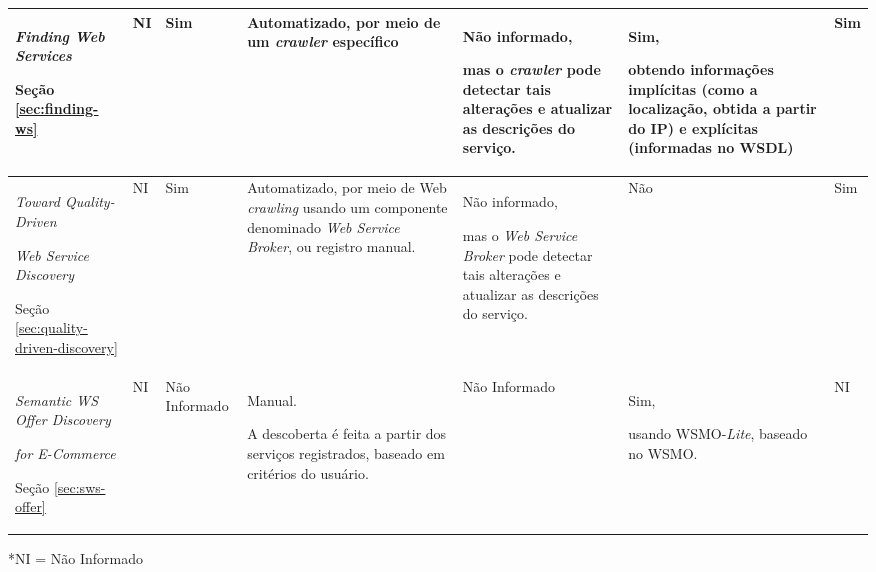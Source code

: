 \begin{center}
{\begin{tabular}{|p{2.5cm}|p{0.6cm}|p{2.5cm}|p{2.9cm}|p{3.5cm}|p{1.5cm}|p{0.4cm}|}
    \hline
	\textit{Finding Web Services} \cite{lausen2007finding}\par Seção \ref{sec:finding-ws} 
	& NI
	& Sim & Automatizado, por meio de um \textit{crawler} específico 
	& Não informado,\par mas o \textit{crawler} pode detectar tais alterações e atualizar as descrições do serviço.
	& Sim,\par obtendo informações implícitas (como a localização, obtida a partir do IP) e explícitas (informadas no WSDL) 
	& Sim \\

    \hline
	\textit{Toward Quality-Driven}\par \textit{Web Service Discovery} \cite{al2008toward}\par Seção \ref{sec:quality-driven-discovery} 
	& NI & Sim
	& Automatizado, por meio de Web \textit{crawling} usando um componente denominado \textit{Web Service Broker}, ou registro manual.
	& Não informado,\par mas o \textit{Web Service Broker} pode detectar tais alterações e atualizar as descrições do serviço.
	& Não & Sim \\

    \hline
   	 \textit{Semantic WS Offer Discovery}\par \textit{for E-Commerce} \cite{kopecky2008semantic}\par Seção \ref{sec:sws-offer} 
	 & NI & Não Informado & Manual.\par A descoberta é feita a partir dos serviços registrados, baseado em critérios do usuário.
	 & Não Informado & Sim,\par usando WSMO-\textit{Lite}, baseado no WSMO. & NI \\

    \hline
	\end{tabular}
	*NI = Não Informado

    \label{tab:comparacao-descoberta-ws}
}
\end{center}
